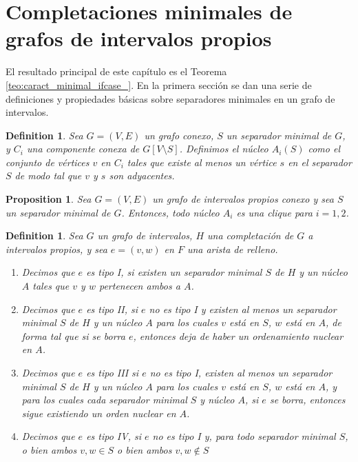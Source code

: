 \documentclass[12pt]{book}
\theoremstyle{plain}
\newtheorem{prop}[teo]{Proposition}
\newtheorem{defn}[teo]{Definition}
\theoremstyle{remark}
\begin{document}
%
\chapter*{Completaciones minimales de grafos de intervalos propios}

El resultado principal de este capítulo es el Teorema \ref{teo:caract_minimal_ifcase_}. En la primera sección se dan una serie de definiciones y propiedades básicas sobre separadores minimales en un grafo de intervalos.

\begin{defn} 
	Sea $G = (V, E)$ un grafo conexo, $S$ un separador minimal de $G$, y $C_i$ una componente conexa de $G \left[ V \setminus S \right]$.
	Definimos el \emph{núcleo $A_i(S)$} como el conjunto de vértices $v$ en $C_i$ tales que existe al menos un vértice $s$ en el separador $S$ de modo tal que $v$ y $s$ son adyacentes.
\end{defn}

\begin{prop} 
	Sea $G = (V, E)$ un grafo de intervalos propios conexo y sea $S$ un separador minimal de $G$. Entonces, todo núcleo $A_i$ es una clique para $i= 1,2$.
\end{prop}

\begin{defn} 
Sea $G$ un grafo de intervalos, $H$ una completación de $G$ a intervalos propios, y sea $e=(v,w)$ en $F$ una arista de relleno.
	\begin{enumerate}
		\item Decimos que \emph{$e$ es tipo I}, si existen un separador minimal $S$ de $H$ y un núcleo $A$ tales que $v$ y $w$ pertenecen ambos a $A$.
		\item Decimos que \emph{$e$ es tipo II}, si $e$ \textit{no es tipo I} y existen al menos un separador minimal $S$ de $H$ y un núcleo $A$ para los cuales $v$ está en $S$, $w$ está en $A$, de forma tal que si se borra $e$, entonces deja de haber un ordenamiento nuclear en $A$. 
		\item Decimos que \emph{$e$ es tipo III} si $e$ no es tipo I, existen al menos un separador minimal $S$ de $H$ y un núcleo $A$ para los cuales $v$ está en $S$, $w$ está en $A$, y para los cuales cada separador minimal $S$ y núcleo $A$, si $e$ se borra, entonces sigue existiendo un orden nuclear en $A$.
		\item Decimos que \emph{$e$ es tipo IV}, si $e$ no es tipo I y, para todo separador minimal $S$, o bien ambos $v,w \in S$ o bien ambos $v,w \not\in S$
	\end{enumerate}
\end{defn}
\end{document}
